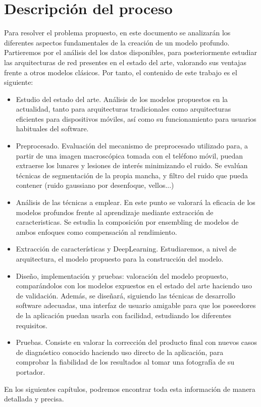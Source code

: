 \section {Descripción del proceso}
Para resolver el problema propuesto, en este documento se analizarán los diferentes aspectos fundamentales de la creación de un modelo profundo. Partieremos por el análisis del los datos disponibles, para posteriormente estudiar las arquitecturas de red presentes en el estado del arte, valorando sus ventajas frente a otros modelos clásicos. Por tanto, el contenido de este trabajo es el siguiente:
\begin{itemize}
	\item Estudio del estado del arte. Análisis de los modelos propuestos en la actualidad, tanto para arquitecturas tradicionales como arquitecturas eficientes para dispositivos móviles, así como su funcionamiento para usuarios habituales del software.
	\item Preprocesado. Evaluación del mecanismo de preprocesado utilizado para, a partir de una imagen macroscópica tomada con el teléfono móvil, puedan extraerse los lunares y lesiones de interés minimizando el ruido. Se evalúan técnicas de segmentación de la propia mancha, y filtro del ruido que pueda contener (ruido gaussiano por desenfoque, vellos...)
	\item Análisis de las técnicas a emplear. En este punto se valorará la eficacia de los modelos profundos frente al aprendizaje mediante extracción de caracteristicas. Se estudia la composición por ensembling de modelos de ambos enfoques como compensación al rendimiento.
	\item Extracción de características y DeepLearning. Estudiaremos, a nivel de arquitectura, el modelo propuesto para la construcción del modelo.
	\item Diseño, implementación y pruebas: valoración del modelo propuesto, comparándolos con los modelos expuestos en el estado del arte haciendo uso de validación. Además, se diseñará, siguiendo las técnicas de desarrollo software adecuadas, una interfaz de usuario amigable para que los poseedores de la aplicación puedan usarla con facilidad, estudiando los diferentes requisitos.
	\item Pruebas. Consiste en valorar la corrección del producto final con nuevos casos de diagnóstico conocido haciendo uso directo de la aplicación, para comprobar la fiabilidad de los resultados al tomar una fotografía de su portador.
\end{itemize}

En los siguientes capítulos, podremos encontrar toda esta información de manera detallada y precisa.	